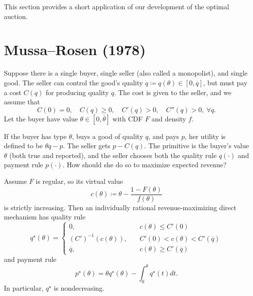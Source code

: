 
This section provides a short application of our development of the optimal auction.

\section{Mussa--Rosen (1978)}
Suppose there is a single buyer, single seller (also called a monopolist), and single good. The seller can control the good's quality $q \coloneqq q(\theta)  \in [0,\overline{q}]$, but must pay a cost $C(q)$ for producing quality $q$. The cost is given to the seller, and we assume that \[
	C(0) = 0, \quad  C(q) \ge 0, \quad C'(q) > 0, \quad C''(q) > 0,\ \forall q
.\] 
Let the buyer have value $\theta \in [0,\overline{\theta}]$ with CDF $F$ and density $f$. 

If the buyer has type $\theta$, buys a good of quality $q$, and pays $p$, her utility is defined to be $\theta q - p$.
The seller gets $p - C(q)$.
The primitive is the buyer's value $\theta$ (both true and reported), and the seller chooses both the quality rule $q(\cdot)$ and payment rule $p(\cdot)$.
How should she do so to maximize expected revenue?

\begin{proposition}
	Assume $F$ is regular, so its virtual value
	\[
		c(\theta) \coloneqq \theta - \frac{1-F(\theta)}{f(\theta)}
	\]
	is strictly increasing. Then an individually rational revenue-maximizing direct mechanism has quality rule
	\[
		q^\star(\theta) = \begin{cases}
			0, \quad &c(\theta) \le C'(0) \\
			\left(C'\right)^{-1}\left( c(\theta) \right), \quad &C'(0) < c(\theta) < C'(\overline{q}) \\
			\overline{q}, \quad &c(\theta) \ge C'(\overline{q})
		\end{cases}
	\]
	and payment rule
	\[
		p^\star(\theta) = \theta q^\star(\theta) - \int_{0}^{\theta} q^\star(t)dt
	.\]
	In particular, $q^\star$ is nondecreasing.
\end{proposition}

